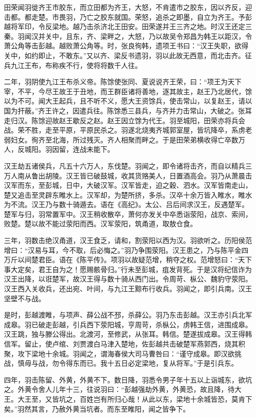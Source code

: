 \documentclass[]{article}
\begin{document}
田荣闻羽徙齐王市胶东，而立田都为齐王，大怒，不肯遣市之胶东，因以齐反，迎击都。都走楚。市畏羽，乃亡之胶东就国。荣怒，追杀之即墨，自立为齐王。予彭越将军印，令反梁地。越乃击杀济北王田安。田荣遂并王三齐之地。时汉王还定三秦。羽闻汉并关中，且东，齐、梁畔之，大怒，乃以故吴令郑昌为韩王以距汉，令萧公角等击彭越。越败萧公角等。时，张良徇韩，遗项王书曰：``汉王失职，欲得关中，如约即止，不敢东。''又以齐、梁反书遗羽，羽以此故无西意，而北击齐。征兵九江王布，布称疾不行，使将将数千人往。

二年，羽阴使九江王布杀义帝。陈馀使张同、夏说说齐王荣，曰：``项王为天下宰，不平，今尽王故王于丑地，而王群臣诸将善地，逐其故主，赵王乃北居代，馀以为不可。闻大王起兵，且不听不义，愿大王资馀兵，使击常山，以复赵王，请以国为扞蔽。''齐王许之，因遣兵往。陈馀悉三县兵，与齐并力击常山，大破之。张耳走归汉。陈馀迎故赵王歇反之赵。赵王因立馀为代王。羽至城阳，田荣亦将兵会战。荣不胜，走至平原，平原民杀之。羽遂北烧夷齐城郭室屋，皆坑降卒，系虏老弱妇女。徇齐至北海，所过残灭。齐人相聚而畔之。于是田荣弟横收得亡卒数万人，反城阳。羽因留，连战未能下。

汉王劫五诸侯兵，凡五十六万人，东伐楚。羽闻之，即令诸将击齐，而自以精兵三万人南从鲁出胡陵。汉王皆已破鼓城，收其货赂美人，日置酒高会。羽乃从萧晨击汉军而东，至彭城，日中，大破汉军。汉军皆走，迫之穀、泗水。汉军皆南走山，楚又追击至灵辟东睢水上。汉军却，为楚所挤，多杀。汉卒十余万皆入睢水，睢水为不流。汉王乃与数十骑遁去。语在《高纪》。太公、吕后间求汉王，反遇楚军。楚军与归，羽常置军中。汉王稍收散卒，萧何亦发关中卒悉诣荥阳，战京、索间，败楚。楚以故不能过荥阳而西。汉军荥阳，筑甬道，取敖仓食。

三年，羽数击绝汉甬道，汉王食乏，请和，割荥阳以西为汉。羽欲听之。历阳侯范增曰：``汉易与耳，今不取，后必悔之。''羽乃争围荥阳。汉王患之，乃与陈平金四万斤以间楚君臣。语在《陈平传》。项羽以故疑范增，稍夺之权。范增怒曰：``天下事大定矣，君王自为之！愿赐骸骨归。''行未至彭城，疽发背死。于是汉将纪信诈为汉王出降，以诳楚军，故汉王得与数十骑从西门出。令周苛、枞公、魏豹守荥阳。汉王西入关收兵，还出宛、叶间，与九江王黥布行收兵。羽闻之，即引兵南。汉王坚壁不与战。

是时，彭越渡睢，与项声、薛公战不邳，杀薛公。羽乃东击彭越。汉王亦引兵北军成皋。羽已破走彭越，引兵西下荥阳城，亨周苛，杀枞公，虏韩王信，进围成皋。汉王跳，独与滕公得出。北渡河，至修武，从张耳。韩信。楚遂拔成皋。汉王得韩信军。留止，使卢绾、刘贾渡白马津入楚地，佐彭越共击破楚军燕郭西，烧其积聚，攻下梁地十余城。羽闻之，谓海春侯大司马曹咎曰：``谨守成皋。即汉欲挑战，慎毋与战，勿令得东而已。我十五日必定梁地，复从将军。''于是引兵东。

四年，羽击陈留、外黄，外黄不下。数日降，羽悉令男子年十五以上诣城东，欲坑之。外黄令舍人儿年十三，往说羽曰：``彭越强劫外黄，外黄恐，故且降，待大王。大王至，又皆坑之，百姓岂有所归心哉！从此以东，梁地十余城皆恐，莫肯下矣。''羽然其言，乃赦外黄当坑者。而东至睢阳，闻之皆争下。
\end{document}
